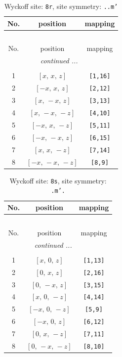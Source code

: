 \documentclass[fleqn,8pt]{jsarticle}
\begin{document}
\begin{longtable}{ccc}
\caption{Wyckoff site: {\tt 8r}, site symmetry: {\tt ..m'}}
 \\
 \hline \hline
No. & position & mapping \\ \hline \endfirsthead

\multicolumn{2}{l}{\tablename\ \thetable{}} \\
 \hline \hline
No. & position & mapping \\ \hline \endhead

 \hline \hline
\multicolumn{2}{r}{\footnotesize\it continued ...} \\ \endfoot

 \hline \hline
\multicolumn{2}{r}{} \\ \endlastfoot

1 & $\left[ x,\, x,\, z \right]$ & {\tt [1,16]} \\ \hline
2 & $\left[ - x,\, x,\, z \right]$ & {\tt [2,12]} \\ \hline
3 & $\left[ x,\, - x,\, z \right]$ & {\tt [3,13]} \\ \hline
4 & $\left[ x,\, - x,\, - z \right]$ & {\tt [4,10]} \\ \hline
5 & $\left[ - x,\, x,\, - z \right]$ & {\tt [5,11]} \\ \hline
6 & $\left[ - x,\, - x,\, z \right]$ & {\tt [6,15]} \\ \hline
7 & $\left[ x,\, x,\, - z \right]$ & {\tt [7,14]} \\ \hline
8 & $\left[ - x,\, - x,\, - z \right]$ & {\tt [8,9]} \\
\end{longtable}
\renewcommand{\arraystretch}{1.2}
\begin{longtable}{ccc}
\caption{Wyckoff site: {\tt 8s}, site symmetry: {\tt .m'.}}
 \\
 \hline \hline
No. & position & mapping \\ \hline \endfirsthead

\multicolumn{2}{l}{\tablename\ \thetable{}} \\
 \hline \hline
No. & position & mapping \\ \hline \endhead

 \hline \hline
\multicolumn{2}{r}{\footnotesize\it continued ...} \\ \endfoot

 \hline \hline
\multicolumn{2}{r}{} \\ \endlastfoot

1 & $\left[ x,\, 0,\, z \right]$ & {\tt [1,13]} \\ \hline
2 & $\left[ 0,\, x,\, z \right]$ & {\tt [2,16]} \\ \hline
3 & $\left[ 0,\, - x,\, z \right]$ & {\tt [3,15]} \\ \hline
4 & $\left[ x,\, 0,\, - z \right]$ & {\tt [4,14]} \\ \hline
5 & $\left[ - x,\, 0,\, - z \right]$ & {\tt [5,9]} \\ \hline
6 & $\left[ - x,\, 0,\, z \right]$ & {\tt [6,12]} \\ \hline
7 & $\left[ 0,\, x,\, - z \right]$ & {\tt [7,11]} \\ \hline
8 & $\left[ 0,\, - x,\, - z \right]$ & {\tt [8,10]} \\
\end{longtable}
\end{document}
